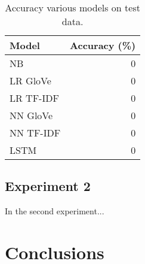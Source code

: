 \documentclass[10pt, a4paper]{article}
\begin{document}
\begin{table}
\caption{Accuracy various models on test data.}
\label{tab:accuracy}
\begin{center}
\begin{tabular}{lr}
\toprule
Model & Accuracy (\%) \\
\midrule
NB            & 0 \\
LR GloVe      & 0 \\
LR TF-IDF     & 0 \\
NN GloVe      & 0 \\
NN TF-IDF     & 0 \\
LSTM          & 0 \\
\bottomrule
\end{tabular}
\end{center}
\end{table}

\subsection{Experiment 2}

In the second experiment...

\section{Conclusions}



 
\end{document}
